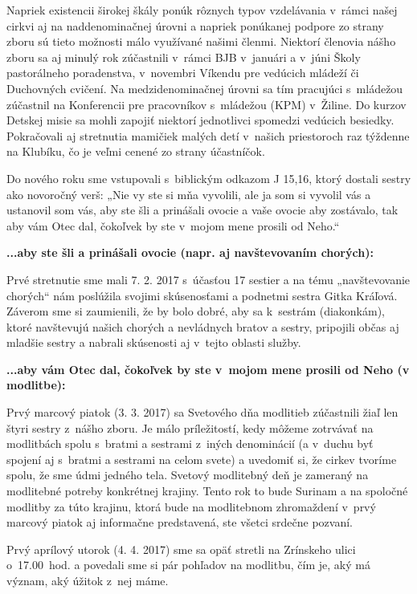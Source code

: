 Napriek existencii širokej škály ponúk rôznych typov vzdelávania v~rámci našej cirkvi aj na naddenominačnej úrovni a napriek ponúkanej podpore zo strany zboru sú tieto možnosti málo využívané našimi členmi. Niektorí členovia nášho zboru sa aj minulý rok zúčastnili v~rámci BJB v~januári a v~júni Školy pastorálneho poradenstva, v~novembri Víkendu pre vedúcich mládeží či Duchovných cvičení. Na medzidenominačnej úrovni sa tím pracujúci s~mládežou zúčastnil na Konferencii pre pracovníkov s~mládežou (KPM) v~Žiline. Do kurzov Detskej misie sa mohli zapojiť niektorí jednotlivci spomedzi vedúcich besiedky.
Pokračovali aj stretnutia mamičiek malých detí v~našich priestoroch raz týždenne na Klubíku, čo je veľmi cenené zo strany účastníčok.



Do nového roku sme vstupovali s~biblickým odkazom J 15,16, ktorý dostali sestry ako novoročný verš: „Nie vy ste si mňa vyvolili, ale ja som si vyvolil vás a ustanovil som vás, aby ste šli a prinášali ovocie a vaše ovocie aby zostávalo, tak aby vám Otec dal, čokoľvek by ste v~mojom mene prosili od Neho.“

{\bf ...aby ste šli a prinášali ovocie (napr. aj navštevovaním chorých):}

Prvé stretnutie sme mali 7. 2. 2017 s~účasťou 17 sestier a na tému „navštevovanie chorých“ nám poslúžila svojimi skúsenosťami a podnetmi sestra Gitka Kráľová. Záverom sme si zaumienili, že by bolo dobré, aby sa k~sestrám (diakonkám), ktoré navštevujú našich chorých a nevládnych bratov a sestry, pripojili občas aj mladšie sestry a nabrali skúsenosti aj v~tejto oblasti služby.

{\bf ...aby vám Otec dal, čokoľvek by ste v~mojom mene prosili od Neho (v modlitbe):}

Prvý marcový piatok (3. 3. 2017) sa Svetového dňa modlitieb zúčastnili žiaľ len štyri sestry z~nášho zboru. Je málo príležitostí, kedy môžeme zotrvávať na modlitbách spolu s~bratmi a sestrami z~iných denominácií (a v~duchu byť spojení aj s~bratmi a sestrami na celom svete) a uvedomiť si, že cirkev tvoríme spolu, že sme údmi jedného tela. Svetový modlitebný deň je zameraný na modlitebné potreby konkrétnej krajiny. Tento rok to bude Surinam a na spoločné modlitby za túto krajinu, ktorá bude na modlitebnom zhromaždení v~prvý marcový piatok aj informačne predstavená, ste všetci srdečne pozvaní.

Prvý aprílový utorok (4. 4. 2017) sme sa opäť stretli na Zrínskeho ulici o~17.00~hod. a povedali sme si pár pohľadov na modlitbu, čím je, aký má význam, aký úžitok z~nej máme.

